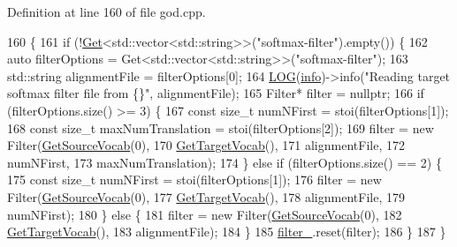 Definition at line 160 of file god.\+cpp.


\begin{DoxyCode}
160                         \{
161   \textcolor{keywordflow}{if} (!\hyperlink{classamunmt_1_1God_ad0d3efbdf165ba0bc4de9052a826f7b6}{Get}<std::vector<std::string>>(\textcolor{stringliteral}{"softmax-filter"}).empty()) \{
162     \textcolor{keyword}{auto} filterOptions = Get<std::vector<std::string>>(\textcolor{stringliteral}{"softmax-filter"});
163     std::string alignmentFile = filterOptions[0];
164     \hyperlink{amun_2common_2logging_8h_a8cad147aca8c526d3c8a03ae14d5c87d}{LOG}(\hyperlink{namespacefix__hard_a31eedbb056537bc1bef47ad5e40eaa68}{info})->info(\textcolor{stringliteral}{"Reading target softmax filter file from \{\}"}, alignmentFile);
165     Filter* filter = \textcolor{keyword}{nullptr};
166     \textcolor{keywordflow}{if} (filterOptions.size() >= 3) \{
167       \textcolor{keyword}{const} \textcolor{keywordtype}{size\_t} numNFirst = stoi(filterOptions[1]);
168       \textcolor{keyword}{const} \textcolor{keywordtype}{size\_t} maxNumTranslation = stoi(filterOptions[2]);
169       filter = \textcolor{keyword}{new} Filter(\hyperlink{classamunmt_1_1God_a032b43755a3050ee9fb97ad27a91a63b}{GetSourceVocab}(0),
170                           \hyperlink{classamunmt_1_1God_aabd3caa5eb93346428948ce6639dc931}{GetTargetVocab}(),
171                           alignmentFile,
172                           numNFirst,
173                           maxNumTranslation);
174     \} \textcolor{keywordflow}{else} \textcolor{keywordflow}{if} (filterOptions.size() == 2) \{
175       \textcolor{keyword}{const} \textcolor{keywordtype}{size\_t} numNFirst = stoi(filterOptions[1]);
176       filter = \textcolor{keyword}{new} Filter(\hyperlink{classamunmt_1_1God_a032b43755a3050ee9fb97ad27a91a63b}{GetSourceVocab}(0),
177                           \hyperlink{classamunmt_1_1God_aabd3caa5eb93346428948ce6639dc931}{GetTargetVocab}(),
178                           alignmentFile,
179                           numNFirst);
180     \} \textcolor{keywordflow}{else} \{
181       filter = \textcolor{keyword}{new} Filter(\hyperlink{classamunmt_1_1God_a032b43755a3050ee9fb97ad27a91a63b}{GetSourceVocab}(0),
182                           \hyperlink{classamunmt_1_1God_aabd3caa5eb93346428948ce6639dc931}{GetTargetVocab}(),
183                           alignmentFile);
184     \}
185     \hyperlink{classamunmt_1_1God_aae4d25701c8177302ea6f07daff690c5}{filter\_}.reset(filter);
186   \}
187 \}
\end{DoxyCode}


